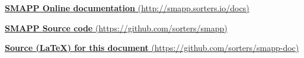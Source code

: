 \href{http://smapp.sorters.io/docs}{\textbf{SMAPP Online documentation} (http://smapp.sorters.io/docs)}

\href{https://github.com/sorters/smapp}{\textbf{SMAPP Source code} (https://github.com/sorters/smapp)}

\href{https://github.com/sorters/smapp-doc}{\textbf{Source (\LaTeX) for this document} (https://github.com/sorters/smapp-doc)}